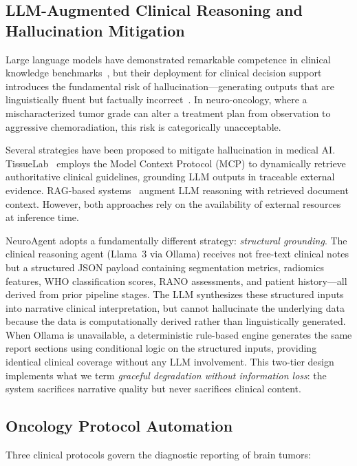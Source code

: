 \subsection{LLM-Augmented Clinical Reasoning and Hallucination Mitigation}

Large language models have demonstrated remarkable competence in clinical knowledge benchmarks~\cite{singhal2023llm}, but their deployment for clinical decision support introduces the fundamental risk of hallucination---generating outputs that are linguistically fluent but factually incorrect~\cite{kalai2025hallucinate, das2025hallucinate}. In neuro-oncology, where a mischaracterized tumor grade can alter a treatment plan from observation to aggressive chemoradiation, this risk is categorically unacceptable.

Several strategies have been proposed to mitigate hallucination in medical AI. TissueLab~\cite{tissuelab2025} employs the Model Context Protocol (MCP) to dynamically retrieve authoritative clinical guidelines, grounding LLM outputs in traceable external evidence. RAG-based systems~\cite{lewis2020rag} augment LLM reasoning with retrieved document context. However, both approaches rely on the availability of external resources at inference time.

NeuroAgent adopts a fundamentally different strategy: \textit{structural grounding}. The clinical reasoning agent (Llama~3 via Ollama) receives not free-text clinical notes but a structured JSON payload containing segmentation metrics, radiomics features, WHO classification scores, RANO assessments, and patient history---all derived from prior pipeline stages. The LLM synthesizes these structured inputs into narrative clinical interpretation, but cannot hallucinate the underlying data because the data is computationally derived rather than linguistically generated. When Ollama is unavailable, a deterministic rule-based engine generates the same report sections using conditional logic on the structured inputs, providing identical clinical coverage without any LLM involvement. This two-tier design implements what we term \textit{graceful degradation without information loss}: the system sacrifices narrative quality but never sacrifices clinical content.

\subsection{Oncology Protocol Automation}

Three clinical protocols govern the diagnostic reporting of brain tumors:

